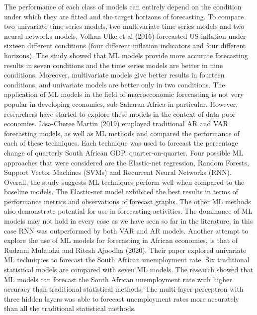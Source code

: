 \documentclass[12pt,italian, twoside]{report}
\begin{document}
The performance of each class of models can entirely depend on the condition under which they are fitted and the target horizons of forecasting. To compare two univariate time series models, two multivariate time series models and two neural networks models, Volkan Ulke et al (2016) forecasted US inflation under sixteen different conditions (four different inflation indicators and four different horizons). The study showed that ML models provide more accurate forecasting results in seven conditions and the time series models are better in nine conditions. Moreover, multivariate models give better results in fourteen conditions, and univariate models are better only in two conditions. 
The application of ML models in the field of macroeconomic forecasting is not very popular in developing economies, sub-Saharan Africa in particular. However, researchers have started to explore these models in the context of data-poor economies. Lisa-Cheree Martin (2019) employed traditional AR and VAR forecasting models, as well as ML methods and compared the performance of each of these techniques. Each technique was used to forecast the percentage change of quarterly South African GDP, quarter-on-quarter. Four possible ML approaches that were considered are the Elastic-net regression, Random Forests, Support Vector Machines (SVMs) and Recurrent Neural Networks (RNN). Overall, the study suggests ML techniques perform well when compared to the baseline models. The Elastic-net model exhibited the best results in terms of performance metrics and observations of forecast graphs. The other ML methods also demonstrate potential for use in forecasting activities. The dominance of ML models may not hold in every case as we have seen so far in the literature, in this case RNN was outperformed by both VAR and AR models. Another attempt to explore the use of ML models for forecasting in African economies, is that of Rudzani Mulaudzi and Ritesh Ajoodha (2020). Their paper explored univariate ML techniques to forecast the South African unemployment rate. Six traditional statistical models are compared with seven ML models. The research showed that ML models can forecast the South African unemployment rate with higher accuracy than traditional statistical methods. The multi-layer perceptron with three hidden layers was able to forecast unemployment rates more accurately than all the traditional statistical methods. \\
\end{document}
